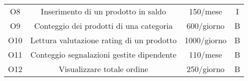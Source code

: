 \begin{center}
\begin{tabular}{ |c|c|c|c|}
\multirow{3}{6em}{O8} & \multirow{3}{12em}{Inserimento di un prodotto in saldo} & \multirow{3}{8em}{150/mese} & \multirow{3}{5em}{I}\\
 & & &\\
 & & &\\
\hline

\multirow{3}{6em}{O9} & \multirow{3}{12em}{Conteggio dei prodotti di una categoria} & \multirow{3}{8em}{600/giorno} & \multirow{3}{5em}{B}\\
 & & &\\
 & & &\\
\hline

\multirow{3}{6em}{O10} & \multirow{3}{12em}{Lettura valutazione rating di un prodotto} & \multirow{3}{8em}{1000/giorno} & \multirow{3}{5em}{B}\\
 & & &\\
 & & &\\
\hline

\multirow{3}{6em}{O11} & \multirow{3}{12em}{Conteggio segnalazioni gestite dipendente} & \multirow{3}{8em}{110/mese} & \multirow{3}{5em}{B}\\
 & & &\\
 & & &\\
\hline

\multirow{3}{6em}{O12} & \multirow{3}{12em}{Visualizzare totale ordine} & \multirow{3}{8em}{250/giorno} & \multirow{3}{5em}{B}\\
 & & &\\
 & & &\\
\hline

\end{tabular}
\end{center}